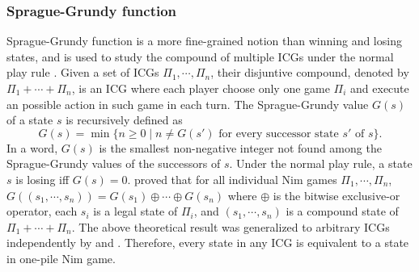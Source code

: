\documentclass[review]{elsarticle}
\newcommand{\set}[1]{\{ #1 \}}
\newcommand{\lxor}{\oplus}
\begin{document}
\subsubsection{Sprague-Grundy function}
Sprague-Grundy function is a more fine-grained notion than winning and losing states, and is used to study the compound of multiple ICGs under the normal play rule \cite{Spr1935,Gru1939}.
Given a set of ICGs $\Pi_1, \cdots, \Pi_n$, their disjuntive compound, denoted by $\Pi_1 + \cdots + \Pi_n$, is an ICG where each player choose only one game $\Pi_i$ and execute an possible action in such game in each turn.
The Sprague-Grundy value $G(s)$ of a state $s$ is recursively defined as 
\[G(s) = \min\set{n \geq 0 \mid n \neq G(s') \text{ for every successor state } s' \text{ of } s}. \]
In a word, $G(s)$ is the smallest non-negative integer not found among the Sprague-Grundy values of the successors of $s$.
Under the normal play rule, a state $s$ is losing iff $G(s) = 0$.
\citet{Bou1901} proved that for all individual Nim games $\Pi_1, \cdots, \Pi_n$, $G((s_1, \cdots, s_n)) = G(s_1) \lxor \cdots \lxor G(s_n)$ where $\lxor$ is the bitwise exclusive-or operator, each $s_i$ is a legal state of $\Pi_i$, and $(s_1, \cdots, s_n)$ is a compound state of $\Pi_1 + \cdots + \Pi_n$.
The above theoretical result was generalized to arbitrary ICGs independently by \citet{Spr1935} and \citet{Gru1939}.
Therefore, every state in any ICG is equivalent to a state in one-pile Nim game.
\end{document}
